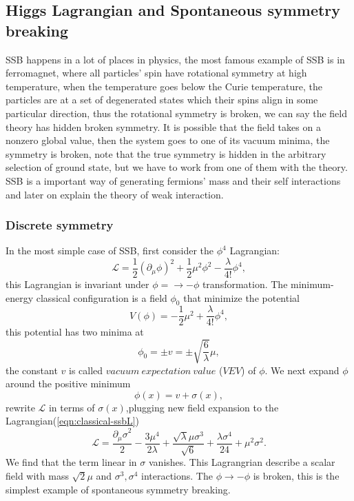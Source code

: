 \documentclass{report}
\numberwithin{equation}{section}
\begin{document}
\subsection{Higgs Lagrangian and Spontaneous symmetry breaking }
SSB happens in a lot of places in physics, the most famous example of SSB is in ferromagnet, where all particles' spin have rotational symmetry at high temperature, when the temperature goes below the Curie temperature,  the particles are at a set of degenerated states which their spins align in some particular direction, thus the rotational symmetry is broken, we can say the field theory has hidden broken symmetry. It is possible that the field takes on a nonzero global value, then the system goes to one of its vacuum minima, the symmetry is broken, note that the true symmetry is hidden in the arbitrary selection of ground state, but we have to work from one of them with the theory. SSB is a important way of generating fermions' mass and their self interactions and later on explain the theory of weak interaction.
\subsubsection{Discrete symmetry}
In the most simple case of SSB, first consider the $\phi^4$ Lagrangian:
\begin{equation}
\label{eqn:classical-ssbL}
\mathcal{L}=\frac{1}{2}(\partial_\mu\phi)^2+\frac{1}{2}\mu^2\phi^2-\frac{\lambda}{4!}\phi^4,
\end{equation}
this Lagrangian is invariant under $\phi=\rightarrow -\phi$ transformation.
The minimum-energy classical configuration is a field $\phi_0$ that minimize the potential
\begin{equation}
V(\phi) = -\frac{1}{2}\mu^2+\frac{\lambda}{4!}\phi^4,
\end{equation}
this potential has two minima at
\begin{equation}
\phi_0=\pm v=\pm \sqrt{\frac{6}{\lambda}}\mu,
\end{equation}
the constant $v$ is called $vacuum\ expectation\ value$ ($VEV$) of $\phi$. We next expand $\phi$ around the positive minimum
\begin{equation}
\label{eqn:phi-sigma}
\phi(x)=v+\sigma(x),
\end{equation}
rewrite $\mathcal{L}$ in terms of $\sigma(x)$,plugging new field expansion to the Lagrangian(\ref{eqn:classical-ssbL})
\begin{equation}
\mathcal{L}=\frac{{\partial_\mu \sigma }^2}{2}-\frac{3 \mu ^4}{2 \lambda }+\frac{\sqrt{{\lambda }}\mu  \sigma ^3}{\sqrt{6} }+\frac{\lambda  \sigma ^4}{24}+\mu ^2 \sigma ^2.
\end{equation}
We find that the term linear in $\sigma$ vanishes. This Lagrangrian describe a scalar field with mass $\sqrt{2}\mu$ and $\sigma^3,\sigma^4$ interactions. The $\phi\rightarrow -\phi $ is broken, this is the simplest example of spontaneous symmetry breaking.
\end{document}
